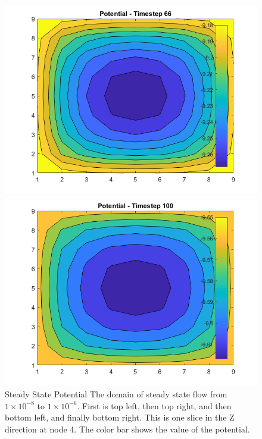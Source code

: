 \begin{figure}
\begin{minipage}[b]{0.45\textwidth}
    \includegraphics[width=\linewidth]{figures/potential_66.png}
  \end{minipage} %
  \begin{minipage}[b]{0.45\textwidth}
    \centering
    \includegraphics[width=\linewidth]{figures/potential_100.png}
  \end{minipage}
  \caption[Steady State Potential]{Steady State Potential \textmd{The domain of steady state flow from \(1\times10^{-8}\) to \(1\times10^{-6}\). First is top left, then top right, and then bottom left, and finally bottom right. This is one slice in the Z direction at node 4. The color bar shows the value of the potential.}}
  \label{fig:steadypot}
\end{figure}


